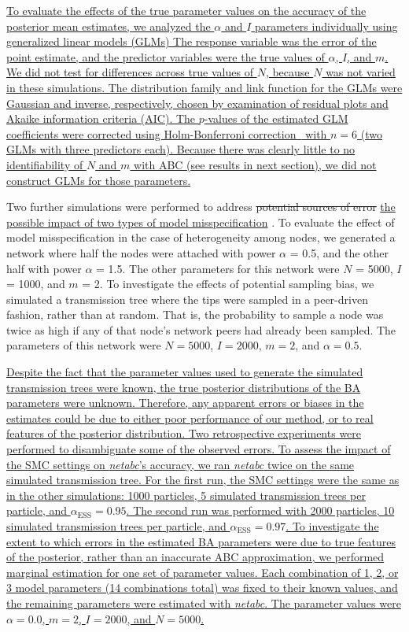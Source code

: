 \documentclass[12pt]{article}\usepackage[]{graphicx}\usepackage[]{color}
\newcommand{\add}[1]{\color{blue} \uline{#1} \color{black}}
\newcommand{\del}[1]{\color{red} \sout{#1} \color{black}}
\begin{document}
\add{To evaluate the effects of the true parameter values on the accuracy of
the posterior mean estimates, we analyzed the $\alpha$ and $I$ parameters
individually using generalized linear models (GLMs) The response variable was
the error of the point estimate, and the predictor variables were the true
values of $\alpha$, $I$, and $m$. We did not test for differences across true
values of $N$, because $N$ was not varied in these simulations. The
distribution family and link function for the GLMs were Gaussian and inverse,
respectively, chosen by examination of residual plots and Akaike information
criteria (AIC). The $p$-values of the estimated GLM coefficients were corrected
using Holm-Bonferroni correction~\autocite{holm1979simple} with $n =
6$ (two GLMs with three predictors each). Because there was clearly little to
no identifiability of $N$ and $m$ with ABC (see results in next section), we
did not construct GLMs for those parameters.}

Two further simulations were performed to address \del{potential sources of
error} \add{the possible impact of two types of model misspecification}. To
evaluate the effect of model misspecification in the case of heterogeneity
among nodes, we generated a network where half the nodes were attached with
power $\alpha$ = 0.5, and the other half with power $\alpha$ = 1.5. The other
parameters for this network were $N$ = 5000, $I$ = 1000, and $m$ = 2. To
investigate the effects of potential sampling bias, we simulated a transmission
tree where the tips were sampled in a peer-driven fashion, rather than at
random. That is, the probability to sample a node was twice as high if any of
that node's network peers had already been sampled. The parameters of this
network were $N= 5000$, $I = 2000$, $m = 2$, and $\alpha = 0.5$.

\add{Despite the fact that the parameter values used to generate the simulated
transmission trees were known, the true posterior distributions of the BA
parameters were unknown. Therefore, any apparent errors or biases in the
estimates could be due to either poor performance of our method, or to real
features of the posterior distribution. Two retrospective experiments were
performed to disambiguate some of the observed errors. To assess the impact of
the SMC settings on \textit{netabc}'s accuracy, we ran \textit{netabc}
twice on the same simulated transmission tree. For the first run, the SMC
settings were the same as in the other simulations: 1000 particles, 5 simulated
transmission trees per particle, and $\alpha_{\text{ESS}} = 0.95$. The second
run was performed with 2000 particles, 10 simulated transmission trees per
particle, and $\alpha_{\text{ESS}} = 0.97$. To investigate the extent to which
errors in the estimated BA parameters were due to true features of the
posterior, rather than an inaccurate ABC approximation, we performed marginal
estimation for one set of parameter values. Each combination of 1, 2, or 3
model parameters (14 combinations total) was fixed to their known values, and
the remaining parameters were estimated with \textit{netabc}. The parameter
values were $\alpha = 0.0$, $m = 2$, $I = 2000$, and $N = 5000$.}
  
\end{document}
